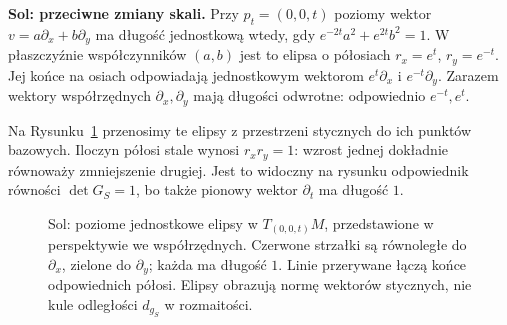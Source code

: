 \textbf{Sol: przeciwne zmiany skali.}
Przy $p_t=(0,0,t)$ poziomy wektor
$v=a\partial_x+b\partial_y$ ma długość jednostkową wtedy,
gdy $e^{-2t}a^2+e^{2t}b^2=1$.
W płaszczyźnie współczynników $(a,b)$ jest to elipsa
o półosiach $r_x=e^t$, $r_y=e^{-t}$.
Jej końce na osiach odpowiadają jednostkowym wektorom
$e^t\partial_x$ i $e^{-t}\partial_y$.
Zarazem wektory współrzędnych $\partial_x,\partial_y$
mają długości odwrotne: odpowiednio $e^{-t},e^t$.

Na Rysunku~\ref{fig:metryka-sol-elipsy} przenosimy
te elipsy z przestrzeni stycznych do ich punktów bazowych.
Iloczyn półosi stale wynosi $r_xr_y=1$:
wzrost jednej dokładnie równoważy zmniejszenie drugiej.
Jest to widoczny na rysunku odpowiednik równości $\det G_S=1$,
bo także pionowy wektor $\partial_t$ ma długość $1$.

\begin{figure}[H]
\centering
{}
\caption{Sol: poziome jednostkowe elipsy w $T_{(0,0,t)}M$,
przedstawione w perspektywie we współrzędnych.
Czerwone strzałki są równoległe do $\partial_x$, zielone do
$\partial_y$; każda ma długość $1$.
Linie przerywane łączą końce odpowiednich półosi.
Elipsy obrazują normę wektorów stycznych, nie kule odległości
$d_{g_S}$ w rozmaitości.}
\label{fig:metryka-sol-elipsy}
\end{figure}

